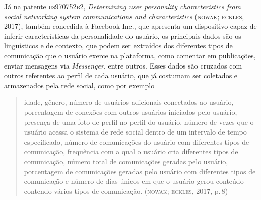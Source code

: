 
Já na patente \textsc{us970752b2}, \textit{Determining user personality
characteristics from social networking system communications and
characteristics} (\textsc{nowak}; \textsc{eckles}, 2017), também concedida à
Facebook Inc., que apresenta um dispositivo capaz de inferir
características da personalidade do usuário, os principais dados são os
linguísticos e de contexto, que podem ser extraídos dos diferentes tipos
de comunicação que o usuário exerce na plataforma, como comentar em
publicações, enviar mensagens via \textit{Messenger}, entre outros. Esses
dados são cruzados com outros referentes ao perfil de cada usuário, que
já costumam ser coletados e armazenados pela rede social, como por
exemplo

\begin{quote}
idade, gênero, número de usuários adicionais conectados ao usuário,
porcentagem de conexões com outros usuários iniciados pelo usuário,
presença de uma foto de perfil no perfil do usuário, número de vezes que
o usuário acessa o sistema de rede social dentro de um intervalo de
tempo especificado, número de comunicações do usuário com diferentes
tipos de comunicação, frequência com a qual o usuário cria diferentes
tipos de comunicação, número total de comunicações geradas pelo usuário,
porcentagem de comunicações geradas pelo usuário com diferentes tipos de
comunicação e número de dias únicos em que o usuário gerou conteúdo
contendo vários tipos de comunicação. (\textsc{nowak}; \textsc{eckles}, 2017, p.\,8)
\end{quote}


